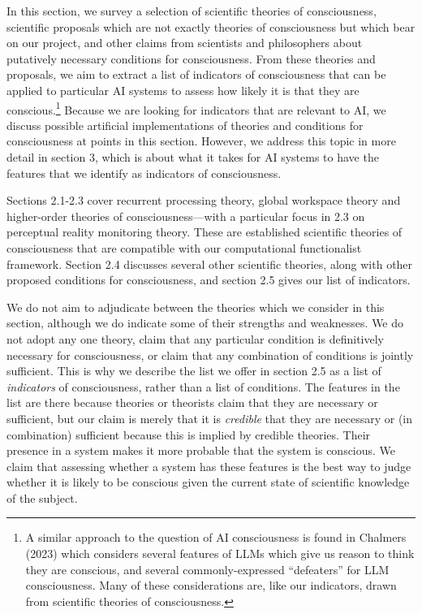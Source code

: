 \documentclass[12pt]{article}
\begin{document}
In this section, we survey a selection of scientific theories of consciousness, scientific proposals which are not exactly theories of consciousness but which bear on our project, and other claims from scientists and philosophers about putatively necessary conditions for consciousness. From these theories and proposals, we aim to extract a list of indicators of consciousness that can be applied to particular AI systems to assess how likely it is that they are conscious.\footnote{A similar approach to the question of AI consciousness is found in Chalmers (2023) which considers several features of LLMs which give us reason to think they are conscious, and several commonly-expressed ``defeaters'' for LLM consciousness. Many of these considerations are, like our indicators, drawn from scientific theories of consciousness.} Because we are looking for indicators that are relevant to AI, we discuss possible artificial implementations of theories and conditions for consciousness at points in this section. However, we address this topic in more detail in section 3, which is about what it takes for AI systems to have the features that we identify as indicators of consciousness.

Sections 2.1-2.3 cover recurrent processing theory, global workspace theory and higher-order theories of consciousness—with a particular focus in 2.3 on perceptual reality monitoring theory. These are established scientific theories of consciousness that are compatible with our computational functionalist framework. Section 2.4 discusses several other scientific theories, along with other proposed conditions for consciousness, and section 2.5 gives our list of indicators.

We do not aim to adjudicate between the theories which we consider in this section, although we do indicate some of their strengths and weaknesses. We do not adopt any one theory, claim that any particular condition is definitively necessary for consciousness, or claim that any combination of conditions is jointly sufficient. This is why we describe the list we offer in section 2.5 as a list of \textit{indicators} of consciousness, rather than a list of conditions. The features in the list are there because theories or theorists claim that they are necessary or sufficient, but our claim is merely that it is \textit{credible} that they are necessary or (in combination) sufficient because this is implied by credible theories. Their presence in a system makes it more probable that the system is conscious. We claim that assessing whether a system has these features is the best way to judge whether it is likely to be conscious given the current state of scientific knowledge of the subject.
\end{document}
